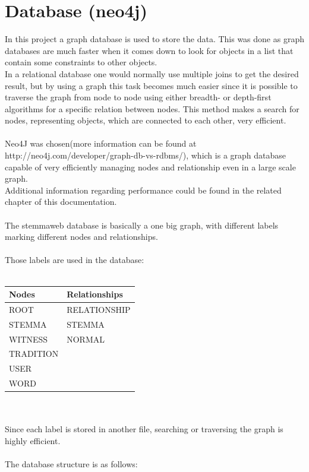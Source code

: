 \documentclass[11pt,fleqn,openany]{book} %
\begin{document}

\chapter{Database (neo4j)}

In this project a graph database is used to store the data. This was done as graph databases are much faster when it comes down to look for objects in a list that contain some constraints to other objects. \\ In a relational database one would normally use multiple joins to get the desired result, but by using a graph this task becomes much easier since it is possible to traverse the graph from node to node using either breadth- or depth-first algorithms for a specific relation between nodes. This method makes a search for nodes, representing objects, which are connected to each other, very efficient. \\ \quad \\ Neo4J was chosen(more information can be found at http://neo4j.com/developer/graph-db-vs-rdbms/), which is a graph database capable of very efficiently managing nodes and relationship even in a large scale graph.\\
Additional information regarding performance could be found in the related chapter of this documentation. \\ \quad \\The stemmaweb database is basically a one big graph, with different labels marking different nodes and relationships. \\ \quad \\Those labels are used in the database:\\ \quad \\
\begin{tabular}{|l|l|}
\hline 
\textbf{Nodes} & \textbf{Relationships} \\ 
\hline 
ROOT & RELATIONSHIP \\ 
\hline 
STEMMA & STEMMA \\ 
\hline 
WITNESS & NORMAL \\ 
\hline 
TRADITION &  \\ 
\hline 
USER &  \\ 
\hline 
WORD &  \\ 
\hline 
\end{tabular} \\\\
Since each label is stored in another file, searching or traversing the graph is highly efficient. \\ \quad \\ The database structure is as follows:
\end{document}
